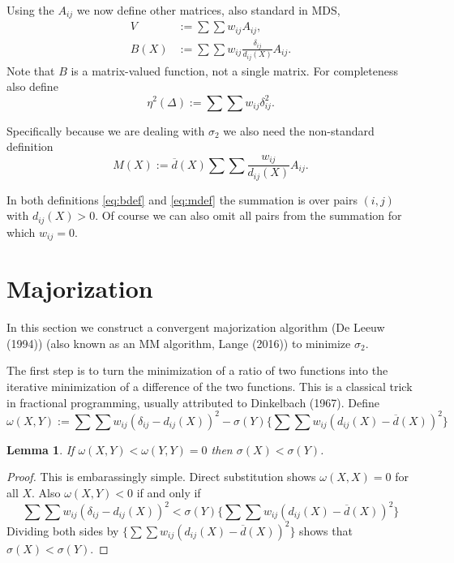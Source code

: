 \documentclass[
  12pt,
]{article}
\newtheorem{lemma}{Lemma}[section]
\theoremstyle{definition}
\theoremstyle{definition}
\theoremstyle{definition}
\theoremstyle{definition}
\theoremstyle{remark}
\begin{document}
Using the \(A_{ij}\) we now define other matrices, also standard in MDS,
\begin{subequations}
\begin{align}
V&:=\sum\sum w_{ij}A_{ij},\label{eq:vdef}\\
B(X)&:=\sum\sum w_{ij}\frac{\delta_{ij}}{d_{ij}(X)}A_{ij}.\label{eq:bdef}
\end{align}
\end{subequations}
Note that \(B\) is a matrix-valued function, not a single matrix. For completeness
also define
\begin{equation}
\eta^2(\Delta):=\sum\sum w_{ij}\delta_{ij}^2.
\label{eq:etadeltadef}
\end{equation}

Specifically because we are dealing with \(\sigma_2\) we also need the non-standard
definition
\begin{equation}
M(X):=\overline{d}(X)\sum\sum\frac{w_{ij}}{d_{ij}(X)}A_{ij}.
\label{eq:mdef}
\end{equation}

In both definitions \eqref{eq:bdef} and \eqref{eq:mdef} the summation is
over pairs \((i,j)\) with \(d_{ij}(X)>0\). Of course we can also omit all
pairs from the summation for which \(w_{ij}=0\).

\section{Majorization}\label{majorization}

In this section we construct a convergent majorization algorithm (De Leeuw (1994))
(also known as an MM algorithm, Lange (2016)) to minimize \(\sigma_2\).

The first step is to turn the minimization of a ratio of two functions into the
iterative minimization of a difference of the two functions. This is
a classical trick in fractional programming, usually attributed to
Dinkelbach (1967). Define
\begin{equation}
\omega(X,Y):=\sum\sum w_{ij}(\delta_{ij} - d_{ij}(X))^2-\sigma(Y)\{\sum\sum w_{ij}(d_{ij}(X)-\overline{d}(X))^2\}
\label{eq:omegadef}
\end{equation}

\begin{lemma}
\protect\hypertarget{lem:dinkelbach}{}\label{lem:dinkelbach}If \(\omega(X,Y)<\omega(Y,Y)=0\) then \(\sigma(X)<\sigma(Y)\).
\end{lemma}

\begin{proof}
This is embarassingly simple.
Direct substitution shows \(\omega(X,X)=0\) for all \(X\). Also \(\omega(X,Y)<0\) if and only if
\begin{equation}
\sum\sum w_{ij}(\delta_{ij} - d_{ij}(X))^2<\sigma(Y)\{\sum\sum w_{ij}(d_{ij}(X)-\overline{d}(X))^2\}
\label{eq:dinkelbach}
\end{equation}
Dividing both sides by \(\{\sum\sum w_{ij}(d_{ij}(X)-\overline{d}(X))^2\}\) shows that \(\sigma(X)<\sigma(Y)\).
\end{proof}
\end{document}
